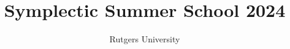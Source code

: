 \documentclass[graybox,envcountchap,sectrefs]{svmono}
\begin{document}
\author{Rutgers University}
\title{Symplectic Summer School 2024}
\subtitle{}

\maketitle

\frontmatter%


\tableofcontents

\mainmatter%






























\backmatter%

\end{document}
